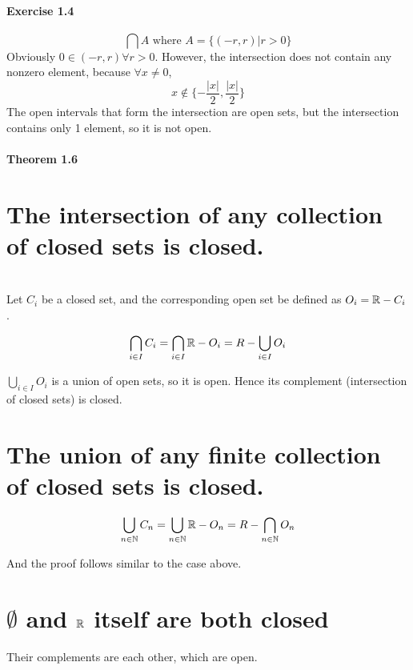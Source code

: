 \subsection{Exercise 1.4}


\begin{solution}
 $$\bigcap A \text{ where } A = \{(-r,r)|r>0\}$$
 Obviously $0 \in (-r,r) \forall r > 0$. However, the intersection does not contain any nonzero element, because $\forall x \neq 0$,
 $$x \notin \{-\frac{|x|}{2},\frac{|x|}{2}\}$$
 The open intervals that form the intersection are open sets, but the intersection contains only 1 element, so it is not open.
\end{solution}

\subsection{Theorem 1.6}

\question

\begin{parts}
 
 \part{The intersection of any collection of closed sets is closed.}
 
 
\begin{solution}
 \\Let $C_i$ be a closed set, and the corresponding open set be defined as $O_i = \mathbb{R} - C_i$.
 
 $$\bigcap_{i \in I} C_i = \bigcap_{i \in I} \mathbb{R} - O_i = R - \bigcup_{i \in I} O_i$$
 
 $\bigcup_{i\in I}O_i$ is a union of open sets, so it is open. Hence its complement (intersection of closed sets) is closed.
\end{solution}

\part{The union of any finite collection of closed sets is closed.}

\begin{solution}
 
 $$\bigcup_{n \in \mathbb{N}} C_n =  \bigcup_{n \in \mathbb{N}} \mathbb{R} - O_n = R - \bigcap_{n \in \mathbb{N}} O_n$$
 
 And the proof follows similar to the case above.
\end{solution}

\part{$\emptyset$ and $\mathbb{R}$ itself are both closed}

\begin{solution}
 Their complements are each other, which are open.
\end{solution}
\end{parts}

